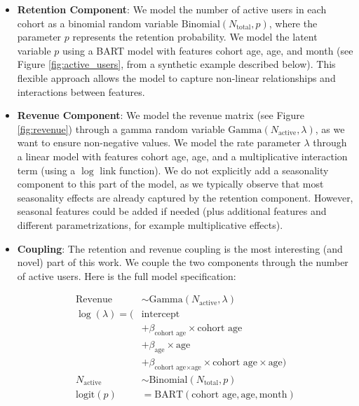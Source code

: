 \documentclass[11pt]{amsart}
\theoremstyle{definition}
\begin{document}
\begin{itemize}
    \item {\bf Retention Component}: We model the number of active users in each cohort as a binomial random
          variable $\text{Binomial}(N_{\text{total}}, p)$, where the parameter $p$ represents the retention probability.
          We model the latent variable $p$ using a BART model with features cohort age, age, and month (see Figure
          \ref{fig:active_users}, from a synthetic example described below). This flexible approach allows the model to
          capture non-linear relationships and interactions between features.

    \item {\bf Revenue Component}: We model the revenue matrix (see Figure \ref{fig:revenue}) through a gamma random variable
          $\text{Gamma}(N_{\text{active}}, \lambda)$, as we want to ensure non-negative values. We model the rate parameter
          $\lambda$ through a linear model with features cohort age, age, and a multiplicative interaction term (using a
          $\log$ link function). We do not explicitly add a seasonality component to this part of the model, as we typically
          observe that most seasonality effects are already captured by the retention component. However, seasonal features
          could be added if needed (plus additional features and different parametrizations, for example multiplicative
          effects).

    \item {\bf Coupling}: The retention and revenue coupling is the most interesting (and novel) part of this work. We
          couple the two components through the number of active users. Here is the full model specification:

          \begin{align*}
              \text{Revenue}    & \sim \text{Gamma}(N_{\text{active}}, \lambda)                                             \\
              \log(\lambda) = ( & \text{intercept}                                                                          \\
                                & + \beta_{\text{cohort age}} \times \text{cohort age}                                      \\
                                & + \beta_{\text{age}} \times \text{age}                                                    \\
                                & + \beta_{\text{cohort age} \times \text{age}} \times \text{cohort age} \times \text{age}) \\
              N_{\text{active}} & \sim \text{Binomial}(N_{\text{total}}, p)                                                 \\
              \textrm{logit}(p) & = \text{BART}(\text{cohort age}, \text{age}, \text{month})
          \end{align*}

\end{itemize}
\end{document}
